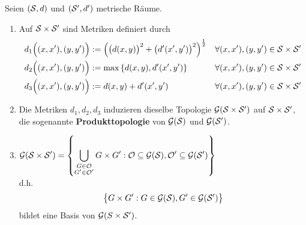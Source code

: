 \begin{satz} %
Seien $(\S,d)$ und $(\S',d')$ metrische Räume.
\begin{enumerate}[label={(\arabic*)}]
\item Auf $\S\times\S'$ sind Metriken definiert durch
\begin{align*}
d_1\Big((x,x'),(y,y')\Big)&:=\left( \big(d(x,y)\big)^2+\big(d'(x',y')\big)^2\right)^{\frac{1}{2}} &\forall(x,x'),(y,y')\in \S\times\S'\\
d_2\Big((x,x'),(y,y')\Big)&:=\max \left\lbrace d(x,y),d'(x',y')\right\rbrace &\forall(x,x'),(y,y')\in \S\times\S'\\
d_3\Big((x,x'),(y,y')\Big)&:=d(x,y)+d'(x',y') &\forall(x,x'),(y,y')\in \S\times\S'
\end{align*}
\item Die Metriken $d_1,d_2,d_3$ induzieren dieselbe Topologie $\mathcal{G}(\S\times \S')$ auf $\S\times\S'$, die sogenannte \textbf{Produkttopologie} von $\mathcal{G}(\S)$ und $\mathcal{G}(\S')$.
\item $\begin{aligned}
\mathcal{G}(\S\times\S')=\left\lbrace\bigcup\limits_{\begin{subarray}{c}G\in\mathcal{O}\\ G'\in\mathcal{O}'\end{subarray}}G\times G':\mathcal{O}\subseteq\mathcal{G}(\S),\mathcal{O}'\subseteq\mathcal{G}(\S')\right\rbrace
\end{aligned}$\\
d.h.
\begin{align*}
\big\lbrace G\times G':G\in\mathcal{G}(\S),G'\in\mathcal{G}(\S')\big\rbrace
\end{align*}
bildet eine Basis von $\mathcal{G}(S\times\S')$.
\end{enumerate}
\end{satz}
